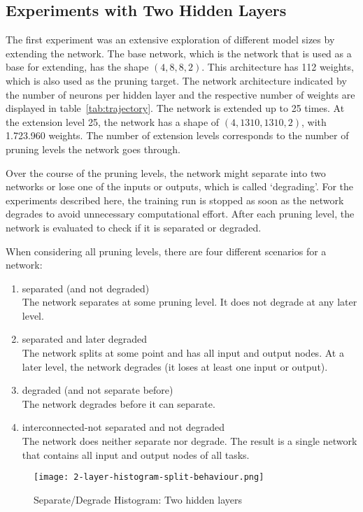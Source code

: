 \subsection{Experiments with Two Hidden Layers}\label{two-hidden}
The first experiment was an extensive exploration of different model sizes by extending the network.
The base network, which is the network that is used as a base for extending, has the shape $(4,8,8,2)$.
This architecture has 112 weights, which is also used as the pruning target.
The network architecture indicated by the number of neurons per hidden layer and the respective number of weights are displayed in table~\ref{tab:trajectory}.
The network is extended up to 25 times.
At the extension level 25, the network has a shape of $(4,1310,1310,2)$, with 1.723.960 weights.
The number of extension levels corresponds to the number of pruning levels the network goes through.

Over the course of the pruning levels, the network might separate into two networks or lose one of the inputs or outputs, which is called `degrading'.
For the experiments described here, the training run is stopped as soon as the network degrades to avoid unnecessary computational effort.
After each pruning level, the network is evaluated to check if it is separated or degraded.

When considering all pruning levels, there are four different scenarios for a network:

\begin{enumerate}
\item separated (and not degraded)\\
The network separates at some pruning level. 
It does not degrade at any later level. 
\item separated and later degraded \\
The network splits at some point and has all input and output nodes.
At a later level, the network degrades (it loses at least one input or output).
\item degraded (and not separate before) \\
The network degrades before it can separate.
\item interconnected-not separated and not degraded \\
The network does neither separate nor degrade. 
The result is a single network that contains all input and output nodes of all tasks.
\end{enumerate}

\begin{figure}[ht]
    \centering
    \texttt{[image: 2-layer-histogram-split-behaviour.png]}
    \caption{
        Separate/Degrade Histogram: Two hidden layers
        }\label{fig:2laxer-histogram}
\end{figure}

